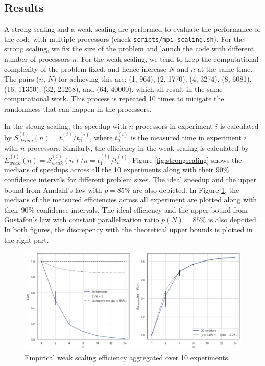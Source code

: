 \documentclass[10pt,journal,compsocconf]{IEEEtran}
\newcommand{\code}[1]{{\small \texttt{#1}}}
\begin{document}
\subsection{Results}

A strong scaling and a weak scaling are performed to evaluate the performance of the code with multiple processors (check \code{scripts/mpi-scaling.sh}). For the strong scaling, we fix the size of the problem and launch the code with different number of processors $n$. For the weak scaling, we tend to keep the computational complexity of the problem fixed, and hence increase $N$ and $n$ at the same time. The pairs ($n$, $N$) for achieving this are: (1, 964), (2, 1770), (4, 3274), (8, 6081), (16, 11350), (32, 21268), and (64, 40000), which all result in the same computational work. This process is repeated 10 times to mitigate the randomness that can happen in the processors.

In the strong scaling, the speedup with $n$ processors in experiment $i$ is calculated by $S^{(i)}_{strong}(n) = t^{(i)}_1 / t^{(i)}_n$, where $t^{(i)}_n$ is the measured time in experiment $i$ with $n$ processors. Similarly, the efficiency in the weak scaling is calculated by $E^{(i)}_{weak}(n) = S^{(i)}_{weak}(n) / n = t^{(i)}_1 / t^{(i)}_n$. Figure \ref{fig:strongscaling} shows the medians of speedups across all the 10 experiments along with their 90\% confidence intervals for different problem sizes. The ideal speedup and the upper bound from Amdahl's law with $p=85\%$ are also depicted. In Figure \ref{fig:weakscaling}, the medians of the measured efficiencies across all experiment are plotted along with their 90\% confidence intervals. The ideal efficiency and the upper bound from Gustafon's law with constant parallelization ratio $p(N)=85\%$ is also depcited. In both figures, the discrepency with the theoretical upper bounds is plotted in the right part.


\begin{figure}[ht]
  \centering
  \includegraphics[width=.75\textwidth]{img/weakscaling.png}
  \caption{Empirical weak scaling efficiency aggregated over 10 experiments.}
  \label{fig:weakscaling}
\end{figure}
\end{document}
